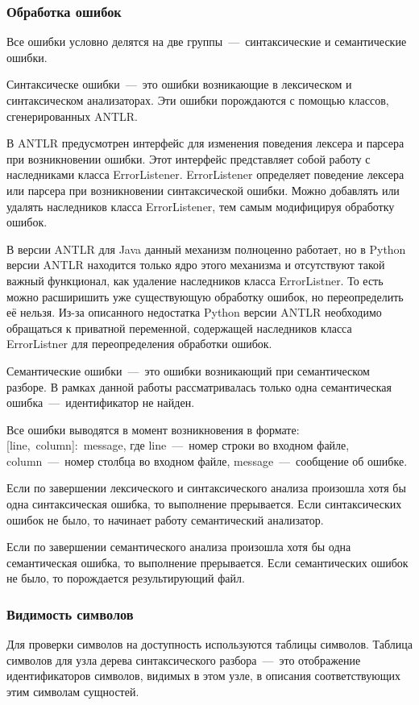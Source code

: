 \documentclass[12pt,a4paper,oneside]{extarticle}
\begin{document}
        \subsubsection{Обработка ошибок}
            Все ошибки условно делятся на две группы~---~синтаксические и семантические ошибки.

            Синтаксическе ошибки~---~это ошибки возникающие в лексическом и синтаксическом анализаторах.
            Эти ошибки порождаются с помощью классов, сгенерированных ANTLR.

            В ANTLR предусмотрен интерфейс для изменения поведения лексера и парсера при возникновении ошибки.
            Этот интерфейс представляет собой работу с наследниками класса ErrorListener.
            ErrorListener определяет поведение лексера или парсера при возникновении синтаксической ошибки.
            Можно добавлять или удалять наследников класса ErrorListener, тем самым модифицируя обработку ошибок.

            В версии ANTLR для Java данный механизм полноценно работает, но в Python версии ANTLR находится только ядро этого механизма и отсутствуют такой важный функционал, как удаление наследников класса ErrorListner.
            То есть можно расширишить уже существующую обработку ошибок, но переопределить её нельзя.
            Из-за описанного недостатка Python версии ANTLR необходимо обращаться к приватной переменной, содержащей наследников класса ErrorListner для переопределения обработки ошибок.

            Семантические ошибки~---~это ошибки возникающий при семантическом разборе. В рамках данной работы рассматривалась только одна семантическая ошибка~---~идентификатор не найден.

            Все ошибки выводятся в момент возникновения в формате: [line,~column]:~message, где line~---~номер строки во входном файле, column~---~номер столбца во входном файле, message~---~сообщение об ошибке.

            Если по завершении лексического и синтаксического анализа произошла хотя бы одна синтаксическая ошибка, то выполнение прерывается. Если синтаксических ошибок не было, то начинает работу семантический анализатор. 

            Если по завершении семантического анализа произошла хотя бы одна семантическая ошибка, то выполнение прерывается. Если семантических ошибок не было, то порождается результирующий файл.

        \subsubsection{Видимость символов}
            Для проверки символов на доступность используются таблицы символов.
            Таблица символов для узла дерева синтаксического разбора~---~это отображение идентификаторов символов, видимых в этом узле, в описания соответствующих этим символам сущностей.
\end{document}
